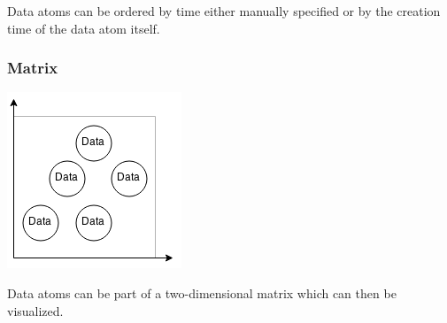 Data atoms can be ordered by time either manually specified or by the creation time of the data atom itself.

\subsubsection{Matrix}

\begin{center}
\includegraphics[width=0.5\linewidth]{00_resources/data_matrix.png}
\end{center}

Data atoms can be part of a two-dimensional matrix which can then be visualized.
